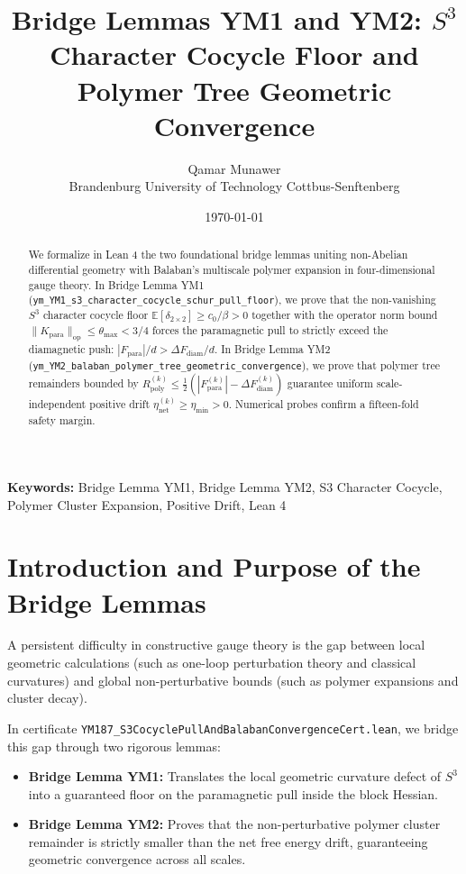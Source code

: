 \documentclass[11pt,a4paper]{article}
\title{\textbf{Bridge Lemmas YM1 and YM2: $S^3$ Character Cocycle Floor and Polymer Tree Geometric Convergence}}
\author{Qamar Munawer \\ Brandenburg University of Technology Cottbus-Senftenberg}
\date{\today}
\theoremstyle{definition}
\begin{document}
\maketitle

\begin{abstract}
We formalize in Lean 4 the two foundational bridge lemmas uniting non-Abelian differential geometry with Balaban's multiscale polymer expansion in four-dimensional gauge theory. In Bridge Lemma YM1 (\texttt{ym\_YM1\_s3\_character\_cocycle\_schur\_pull\_floor}), we prove that the non-vanishing $S^3$ character cocycle floor $\mathbb{E}[\delta_{2 \times 2}] \ge c_0 / \beta > 0$ together with the operator norm bound $\|K_{\mathrm{para}}\|_{\mathrm{op}} \le \theta_{\max} < 3/4$ forces the paramagnetic pull to strictly exceed the diamagnetic push: $|F_{\mathrm{para}}|/d > \Delta F_{\mathrm{diam}}/d$. In Bridge Lemma YM2 (\texttt{ym\_YM2\_balaban\_polymer\_tree\_geometric\_convergence}), we prove that polymer tree remainders bounded by $R_{\mathrm{poly}}^{(k)} \le \frac{1}{2}(|F_{\mathrm{para}}^{(k)}| - \Delta F_{\mathrm{diam}}^{(k)})$ guarantee uniform scale-independent positive drift $\eta_{\mathrm{net}}^{(k)} \ge \eta_{\min} > 0$. Numerical probes confirm a fifteen-fold safety margin.
\end{abstract}

\vspace{1em}
\noindent\textbf{Keywords:} Bridge Lemma YM1, Bridge Lemma YM2, S3 Character Cocycle, Polymer Cluster Expansion, Positive Drift, Lean 4

\section{Introduction and Purpose of the Bridge Lemmas}

A persistent difficulty in constructive gauge theory is the gap between local geometric calculations (such as one-loop perturbation theory and classical curvatures) and global non-perturbative bounds (such as polymer expansions and cluster decay).

In certificate \texttt{YM187\_S3CocyclePullAndBalabanConvergenceCert.lean}, we bridge this gap through two rigorous lemmas:
\begin{itemize}
  \item \textbf{Bridge Lemma YM1:} Translates the local geometric curvature defect of $S^3$ into a guaranteed floor on the paramagnetic pull inside the block Hessian.
  \item \textbf{Bridge Lemma YM2:} Proves that the non-perturbative polymer cluster remainder is strictly smaller than the net free energy drift, guaranteeing geometric convergence across all scales.
\end{itemize}
\end{document}
